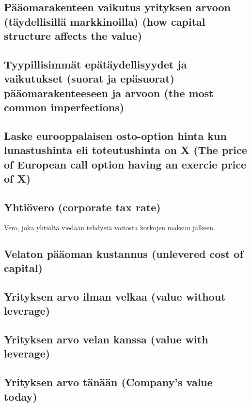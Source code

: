 \documentclass[a4paper]{article}
\begin{document}
\subsection{Pääomarakenteen vaikutus yrityksen arvoon (täydellisillä markkinoilla) (how capital structure affects the value)}

\subsection{Tyypillisimmät epätäydellisyydet ja vaikutukset (suorat ja epäsuorat) pääomarakenteeseen ja arvoon
(the most common imperfections)}

\subsection{Laske eurooppalaisen osto-option hinta kun lunastushinta eli toteutushinta on X (The price of European call option having an exercie price of X)}

\subsection{Yhtiövero (corporate tax rate)}

Vero, joka yhtiöltä viedään tehdystä voitosta korkojen maksun jälkeen.

\subsection{Velaton pääoman kustannus (unlevered cost of capital)}

\subsection{Yrityksen arvo ilman velkaa (value without leverage)}

\subsection{Yrityksen arvo velan kanssa (value with leverage)}


\subsection{Yrityksen arvo tänään (Company's value today)}
\end{document}
